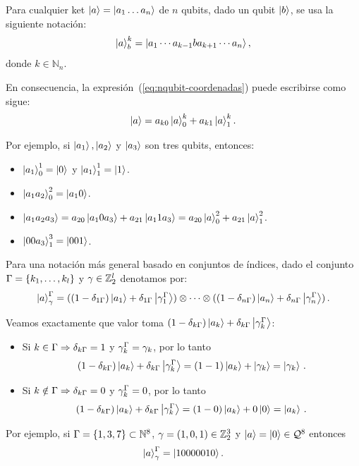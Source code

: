 \begin{notation}
  Para cualquier ket $\ket{a}=\ket{a_1\dots a_n}$ de $n$ qubits, dado un qubit $\ket{b}$, se usa la siguiente notación:
  \begin{equation}
    \label{eq:nqubit-only-one-state}
    \ket{a}^{k}_{b} = \ket{a_1\cdots a_{k-1}b a_{k+1}\cdots a_n},
  \end{equation}
  donde $k \in \mathbb{N}_n$.
\end{notation}

En consecuencia, la expresión~(\ref{eq:nqubit-coordenadas}) puede escribirse como sigue:
\begin{equation}
  \label{eq:canonical-state}
  \ket{a}= a_{k0}\ket{a}^{k}_{0}+a_{k1}\ket{a}^{k}_{1}.
\end{equation}

Por ejemplo, si $\ket{a_1},\ket{a_2}$ y $\ket{a_3}$ son tres qubits, entonces:
\begin{itemize}
  \item $\ket{a_1}^{1}_{0}=\ket{0}$ y $\ket{a_1}^{1}_{1}=\ket{1}$.
  \item $\ket{a_1 a_2}^{2}_{0}=\ket{a_1 0}$.
  \item $\ket{a_1 a_2 a_3}=a_{20}\ket{a_1 0 a_3}+a_{21}\ket{a_1 1 a_3}=a_{20}\ket{a}^{2}_{0}+a
          _{21}\ket{a}^{2}_{1}$.
  \item $\ket{00a_3}^{3}_{1}=\ket{001}$.
\end{itemize}

\begin{notation}
  Para una notación más general basado en conjuntos de índices, dado el conjunto $\Gamma=\{k_1,\dots,k_l\}$ y $\gamma\in\mathbb{Z}_2^l$ denotamos por:
  \[
    \ket{a}^{\Gamma}_{\gamma}=((1-\delta_{1\Gamma})\ket{a_1}+\delta_{1\Gamma}\ket{{\gamma}^{\Gamma}_1})\otimes\dots\otimes ((1-\delta_{n\Gamma})\ket{a_n}+\delta_{n\Gamma}\ket{{\gamma}^{\Gamma}_n})\,.
  \]
\end{notation}

Veamos exactamente que valor toma $(1-\delta_{k\Gamma})\ket{a_k}+\delta_{k\Gamma}\ket{{\gamma}^{\Gamma}_k}$:
\begin{itemize}
  \item Si $k\in\Gamma\Rightarrow\delta_{k\Gamma}=1$ y ${\gamma}^{\Gamma}_k=\gamma_k$, por lo tanto
        \begin{equation*}
          (1-\delta_{k\Gamma})\ket{a_k}+\delta_{k\Gamma}\ket{{\gamma}^{\Gamma}_k}=(1-1)\ket{a_k}+\ket{\gamma_k}=\ket{\gamma_k}\,.
        \end{equation*}
  \item Si $k\notin\Gamma\Rightarrow\delta_{k\Gamma}=0$ y ${\gamma}^{\Gamma}_k=0$, por lo tanto
        \begin{equation*}
          (1-\delta_{k\Gamma})\ket{a_k}+\delta_{k\Gamma}\ket{{\gamma}^{\Gamma}_k}=(1-0)\ket{a_k}+0\ket{0}=\ket{a_k}\,.
        \end{equation*}
\end{itemize}

Por ejemplo, si $\Gamma=\{1,3,7\}\subset \mathbb{N}^8$, $\gamma=(1,0,1)\in\mathbb{Z}_2^3$ y $\ket{a}=\ket{0}\in\mathcal{Q}^8$ entonces
\[
  \ket{a}^{\Gamma}_{\gamma}=\ket{10000010}.
\]
